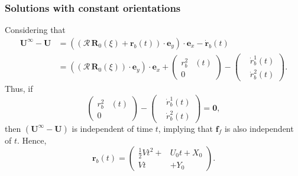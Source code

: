 \documentclass{beamer}
\begin{document}
\begin{frame}
	\frametitle{Solutions with constant orientations}
	\begin{overlayarea}{\textwidth}{\textheight}
\small Considering that
\begin{equation*}
	\label{eqn:45}
	\begin{aligned}
		\textbf{U}^{\infty}-\textbf{U}&=\left((\mathbf{\mathcal{R}}\,\textbf{R}_0(\xi)+\textbf{r}_b(t))\cdot\textbf{e}_y\right)\cdot\textbf{e}_x-\dot{\textbf{r}}_b(t)\\
		&=\left((\mathbf{\mathcal{R}}\,\textbf{R}_0(\xi))\cdot\textbf{e}_y\right)\cdot\textbf{e}_x+\left(\begin{aligned}
			r_b^{2}&(t)\\
			0&
		\end{aligned}\right)-\left(\begin{aligned}
			&\dot{r}_b^{1}(t) \\
			&\dot{r}_b^{2}(t)
		\end{aligned}\right).
	\end{aligned}
\end{equation*}
Thus, if 
\begin{equation*}
	\label{eqn:46}
	\left(\begin{aligned}
		r_b^{2}&(t)\\
		0&
	\end{aligned}\right)-\left(\begin{aligned}
		&\dot{r}_b^{1}(t) \\
		&\dot{r}_b^{2}(t)
	\end{aligned}\right)=\textbf{0},
\end{equation*}
then $(\textbf{U}^{\infty}-\textbf{U})$ is independent of time $t$, implying that $\textbf{f}_{f}$ is also independent of $t$.
Hence,
\begin{equation*}
	\label{eqn:47}
	\textbf{r}_b(t)=\left(\begin{aligned}
		\frac{1}{2}V t^2+&U_0t+X_0\\
		Vt&+Y_0
	\end{aligned}\right).
\end{equation*}
	\end{overlayarea}
\end{frame}

\end{document}
